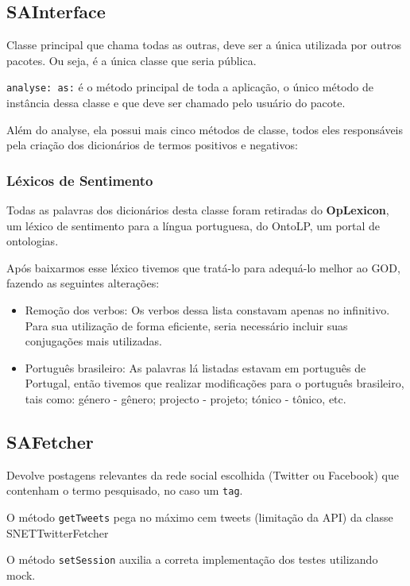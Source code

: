 \subsection{SAInterface}
Classe principal que chama todas as outras, deve ser a única utilizada por outros pacotes. Ou seja, é a única classe que seria pública.

\texttt{analyse: as:} é o método principal de toda a aplicação, o único método de instância dessa classe e que deve ser chamado pelo usuário do pacote.

Além do analyse, ela possui mais cinco métodos de classe, todos eles responsáveis pela criação dos dicionários de termos positivos e negativos:

\subsubsection{Léxicos de Sentimento}
Todas as palavras dos dicionários desta classe foram retiradas do \textbf{OpLexicon}, um léxico de sentimento para a língua portuguesa, do OntoLP, um portal de ontologias.

Após baixarmos esse léxico tivemos que tratá-lo para adequá-lo melhor ao GOD, fazendo as seguintes alterações:

\begin{itemize}

	\item Remoção dos verbos:
	Os verbos dessa lista constavam apenas no infinitivo. Para sua utilização de forma eficiente, seria necessário incluir suas conjugações mais utilizadas.
	
	\item Português brasileiro:
	As palavras lá listadas estavam em português de Portugal, então tivemos que realizar modificações para o português brasileiro, tais como: género - gênero; projecto - projeto; tónico - tônico, etc.
	
\end{itemize}

\subsection{SAFetcher}
Devolve postagens relevantes da rede social escolhida (Twitter ou Facebook) que contenham o termo pesquisado, no caso um \texttt{tag}.

O método \texttt{getTweets} pega no máximo cem tweets (limitação da API) da classe SNETTwitterFetcher

O método \texttt{setSession} auxilia a correta implementação dos testes utilizando mock.

